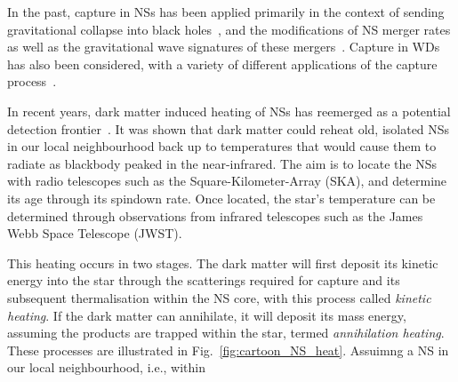 In the past, capture in NSs has been applied primarily in the context of sending gravitational collapse into black holes~\cite{McDermott:2011jp_ConstraintsScalarAsymmetric,Kouvaris:2011fi_ExcludingLightAsymmetric,Guver:2012ba_may_Capturedarkmattera,Garani:2018kkd_may_NewAnalysisNeutron,Bramante:2013nma_jan_Boundsselfinteractingfermion,Bertoni:2013bsa_dec_DarkMatterThermalization,Bell:2013xk_jun_Realisticneutronstar}, and the modifications of NS merger rates as well as the gravitational wave signatures of these mergers~\cite{Bramante:2017ulk_mar_SearchingDarkMatter, Ellis:2017jgp_jun_SearchDarkMatter, Ellis:2018bkr_jun_DarkMatterEffects,Nelson:2018xtr_jul_Darkhalosneutron}. Capture in WDs has also been considered, with a variety of different applications of the capture process~\cite{Steigerwald:2019efv_dec_DarkMatterThermonuclear, Panotopoulos:2020kuo_jun_Constraintslightdark, McCullough:2010ai_CaptureInelasticDark, Hooper:2010es_InelasticDarkMatter, Bramante:2015cua_sep_Darkmatterignition, Bertone:2007ae_CompactStarsDark}. 

In recent years, dark matter induced heating of NSs has reemerged as a potential detection frontier~\cite{Raj:2017wrv_feb_Neutronstarsdark, Baryakhtar:2017dbj_sep_DarkKineticHeating, Bell:2018pkk_sep_HeatingNeutronStars,Joglekar:2019vzy_sep_Relativisticcapturedark, Acevedo:2019agu_mar_WarmingNuclearPasta, Bell:2019pyc_jun_CaptureLeptophilicDark, Garani:2019fpa_aug_Darkmatterinteractions, Chatterjee:2022dhp_jul_Faintlightolda}. It was shown that dark matter could reheat old, isolated NSs in our local neighbourhood back up to temperatures that would cause them to radiate as blackbody peaked in the near-infrared. 
The aim is to locate the NSs with radio telescopes such as the Square-Kilometer-Array (SKA), and determine its age through its spindown rate. 
Once located, the star's temperature can be determined through observations from infrared telescopes such as the James Webb Space Telescope (JWST).

This heating occurs in two stages. The dark matter will first deposit its kinetic energy into the star through the scatterings required for capture and its subsequent thermalisation within the NS core, with this process called \textit{kinetic heating}. If the dark matter can annihilate, it will deposit its mass energy, assuming the products are trapped within the star, termed \textit{annihilation heating}. These processes are illustrated in Fig.~\ref{fig:cartoon_NS_heat}. Assuimng a NS in our local neighbourhood, i.e., within 

